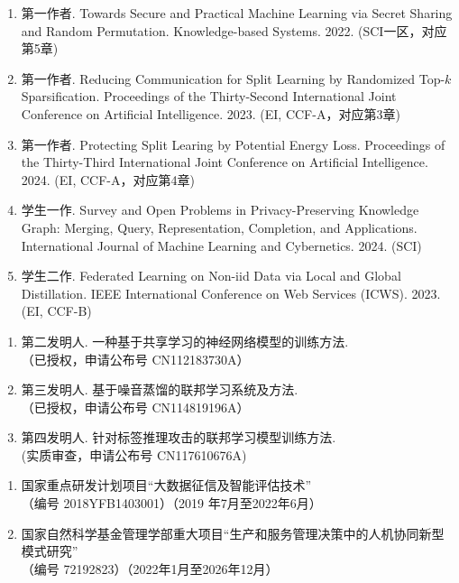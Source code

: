 \cleardoublepage
{}

\begin{enumerate}
    \item 第一作者. Towards Secure and Practical Machine Learning via Secret Sharing and Random Permutation. Knowledge-based Systems. 2022. (SCI一区，对应第5章)
    \item 第一作者. Reducing Communication for Split Learning by Randomized Top-$k$ Sparsification. Proceedings of the Thirty-Second International Joint Conference on Artificial Intelligence. 2023. (EI, CCF-A，对应第3章)
    \item 第一作者. Protecting Split Learing by Potential Energy Loss. Proceedings of the Thirty-Third International Joint Conference on Artificial Intelligence. 2024. (EI, CCF-A，对应第4章)
    \item 学生一作. Survey and Open Problems in Privacy-Preserving Knowledge Graph: Merging, Query, Representation, Completion, and Applications. International Journal of Machine Learning and Cybernetics. 2024. (SCI)
    \item 学生二作. Federated Learning on Non-iid Data via Local and Global Distillation. IEEE International Conference on Web Services (ICWS). 2023. (EI, CCF-B)
\end{enumerate}

\begin{enumerate}
    \item 第二发明人. 一种基于共享学习的神经网络模型的训练方法. \\
    （已授权，申请公布号 CN112183730A）
    \item 第三发明人. 基于噪音蒸馏的联邦学习系统及方法. \\
    （已授权，申请公布号
     CN114819196A）
    \item 第四发明人. 针对标签推理攻击的联邦学习模型训练方法. \\
    (实质审查，申请公布号 CN117610676A)
\end{enumerate}



\begin{enumerate}
    \item 国家重点研发计划项目“大数据征信及智能评估技术”\\
    （编号 2018YFB1403001）（2019 年7月至2022年6月）
    \item 国家自然科学基金管理学部重大项目“生产和服务管理决策中的人机协同新型模式研究”\\
    （编号 72192823）（2022年1月至2026年12月）
\end{enumerate}